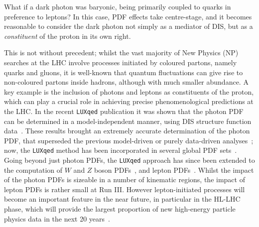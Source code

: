 \documentclass[withindex,glossary]{cam-thesis}
\begin{document}
\noindent What if a dark photon was baryonic, being primarily coupled to quarks in preference to leptons? In this case, PDF effects take centre-stage, and 
it becomes reasonable to consider the dark photon not simply as a mediator of DIS, but as a \textit{constituent} of the proton in its own right. 

This is not without precedent; whilst the vast majority of New Physics (NP) searches at the LHC
involve processes initiated by coloured partons, namely
quarks and gluons, it is well-known that quantum fluctuations can give rise to non-coloured
partons inside hadrons, although with much smaller abundance. A key example is the inclusion 
of photons and leptons as constituents of the proton, which can play a
crucial role in achieving precise phenomenological
predictions at the LHC. In the recent {\tt LUXqed} publication it was shown that the photon PDF can
be determined in a model-independent manner, using DIS structure
function data~\cite{Manohar:2016nzj,Manohar:2017eqh}. These results brought an extremely accurate
determination of the photon PDF, that superseded the previous model-driven or purely data-driven analyses~\cite{Martin:2005,Ball:2013}; now, the {\tt LUXqed} method has been incorporated in several global PDF sets~\cite{Bertone:2017bme,Cridge:2021pxm,Guzzi:2021rvo}.
Going beyond just photon PDFs, the {\tt LUXqed} approach has since been extended to the computation
of $W$ and $Z$ boson PDFs~\cite{Fornal:2018znf}, and lepton PDFs~\cite{Buonocore:2020nai}.
Whilst the impact of the photon PDFs is sizeable in a number of
kinematic regions, the impact of lepton PDFs is rather small at Run III. However
lepton-initiated processes will become an important feature in the near future, 
in particular in the HL-LHC phase, which  
will provide the largest proportion of new high-energy particle physics data in the next 20 years~\cite{Buonocore:2020erb,Greljo:2020tgv,Buonocore:2021bsf,Harland-Lang:2021zvr}.
\end{document}
